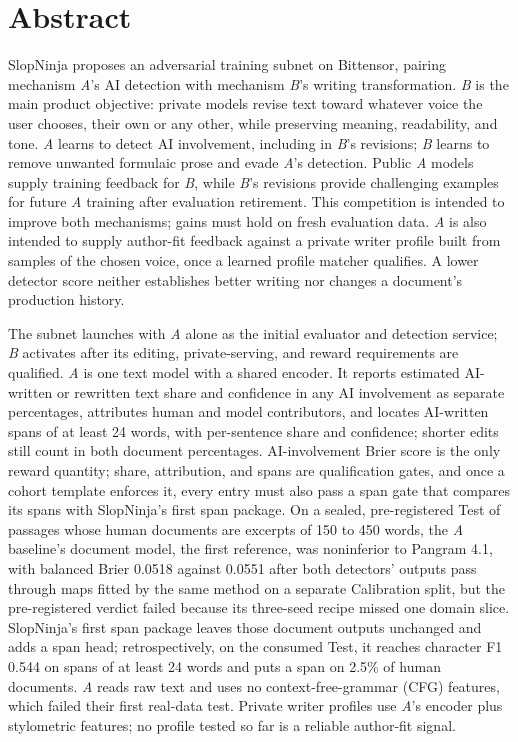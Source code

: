 \section*{Abstract}\label{abstract}

SlopNinja proposes an adversarial training subnet on Bittensor, pairing
mechanism \textit{A}'s AI detection with mechanism \textit{B}'s writing
transformation. \textit{B} is the main product objective: private models revise
text toward whatever voice the user chooses, their own or any other, while
preserving meaning, readability, and tone. \textit{A} learns to detect AI
involvement, including in \textit{B}'s revisions; \textit{B} learns to remove
unwanted formulaic prose and evade \textit{A}'s detection. Public \textit{A}
models supply training feedback for \textit{B}, while \textit{B}'s revisions
provide challenging examples for future \textit{A} training after evaluation
retirement. This competition is intended to improve both mechanisms; gains must
hold on fresh evaluation data. \textit{A} is also intended to supply author-fit
feedback against a private writer profile built from samples of the chosen
voice, once a learned profile matcher qualifies. A lower detector score neither
establishes better writing nor changes a document's production history.

The subnet launches with \textit{A} alone as the initial evaluator and detection
service; \textit{B} activates after its editing, private-serving, and reward
requirements are qualified. \textit{A} is one text model with a shared encoder.
It reports estimated AI-written or rewritten text share and confidence in any
AI involvement as separate percentages, attributes human and model
contributors, and locates AI-written spans of at least 24 words, with
per-sentence share and confidence; shorter edits still count in both document
percentages. AI-involvement Brier score is the only reward quantity; share,
attribution, and spans are qualification gates, and once a cohort template
enforces it, every entry must also pass a span gate that compares its spans
with SlopNinja's first span package. On a sealed, pre-registered Test of
passages whose human documents are excerpts of 150 to 450 words, the
\textit{A} baseline's document model, the first reference, was noninferior to
Pangram 4.1, with balanced Brier 0.0518 against 0.0551 after both detectors'
outputs pass through maps fitted by the same method on a separate Calibration
split, but the pre-registered verdict failed because its three-seed recipe
missed one domain slice. SlopNinja's first span package leaves those document
outputs unchanged and adds a span head; retrospectively, on the consumed Test,
it reaches character F1 0.544 on spans of at least 24 words and puts a span on
2.5\% of human documents. \textit{A} reads raw text and uses no
context-free-grammar (CFG) features, which failed their first real-data test.
Private writer profiles use \textit{A}'s encoder plus stylometric features; no
profile tested so far is a reliable author-fit signal.

